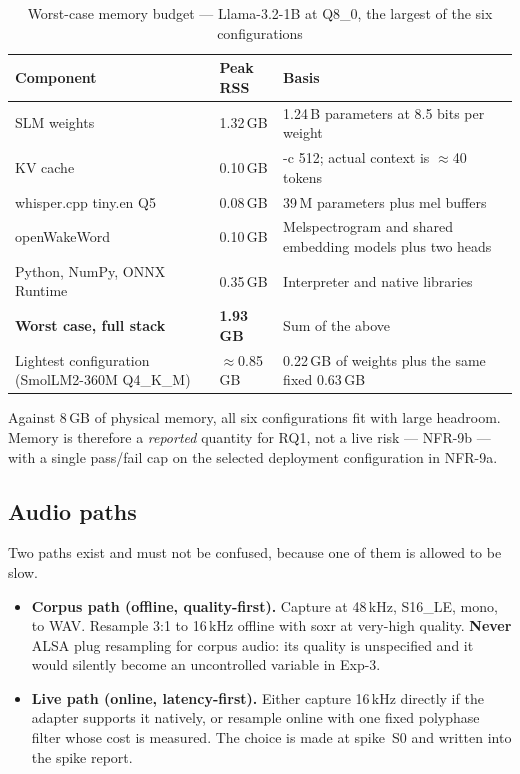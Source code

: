 \documentclass[11pt,a4paper]{article}
\newcommand{\code}[1]{{\ttfamily\small #1}}
\newcommand{\munit}[1]{\,#1}
\begin{document}
\begin{table}[htbp]
\centering
\caption{Worst-case memory budget --- Llama-3.2-1B at Q8\_0, the largest of the six configurations}
\label{tab:mem}
\small
\begin{tabular}{@{}P{0.40}P{0.18}P{0.30}@{}}
\toprule
\textbf{Component} & \textbf{Peak RSS} & \textbf{Basis} \\
\midrule
SLM weights            & 1.32\munit{GB} & 1.24\munit{B} parameters at 8.5 bits per weight \\
KV cache               & 0.10\munit{GB} & \code{-c 512}; actual context is $\approx$40 tokens \\
\code{whisper.cpp} \code{tiny.en} Q5 & 0.08\munit{GB} & 39\munit{M} parameters plus mel buffers \\
openWakeWord           & 0.10\munit{GB} & Melspectrogram and shared embedding models plus two heads \\
Python, NumPy, ONNX Runtime & 0.35\munit{GB} & Interpreter and native libraries \\
\midrule
\textbf{Worst case, full stack} & \textbf{1.93\munit{GB}} & Sum of the above \\
Lightest configuration (SmolLM2-360M Q4\_K\_M) & $\approx$0.85\munit{GB} & 0.22\munit{GB} of weights plus
  the same fixed 0.63\munit{GB} \\
\bottomrule
\end{tabular}
\end{table}

Against 8\munit{GB} of physical memory, all six configurations fit with large headroom. Memory is
therefore a \emph{reported} quantity for RQ1, not a live risk --- NFR-9b --- with a single pass/fail cap on
the selected deployment configuration in NFR-9a.

\subsection{Audio paths}
\label{sec:audio}

Two paths exist and must not be confused, because one of them is allowed to be slow.

\begin{itemize}[leftmargin=1.4em,itemsep=3pt]
  \item \textbf{Corpus path (offline, quality-first).} Capture at 48\munit{kHz}, \code{S16\_LE}, mono, to
        WAV. Resample 3:1 to 16\munit{kHz} offline with \code{soxr} at very-high quality. \textbf{Never}
        ALSA \code{plug} resampling for corpus audio: its quality is unspecified and it would silently
        become an uncontrolled variable in Exp-3.
  \item \textbf{Live path (online, latency-first).} Either capture 16\munit{kHz} directly if the adapter
        supports it natively, or resample online with one fixed polyphase filter whose cost is measured.
        The choice is made at spike~S0 and written into the spike report.
\end{itemize}
\end{document}
